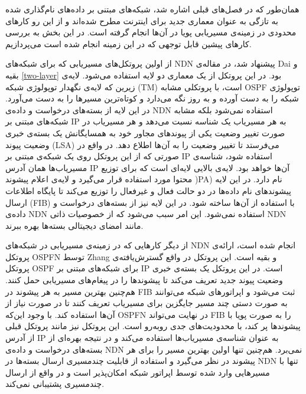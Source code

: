
\label{prevWorks}

همان‌طور که در فصل‌های قبلی اشاره شد، شبکه‌های مبتنی بر داده‌‌های نام‌گذاری شده به تازگی به عنوان معماری جدید برای اینترنت مطرح شده‌اند و از این رو کارهای محدودی در زمینه‌ی مسیریابی پویا در آن‌ها انجام گرفته است. در این بخش به بررسی کارهای پیشین قابل توجهی که در این زمینه انجام شده است می‌پردازیم.

از اولین پروتکل‌های مسیریابی که برای شبکه‌های NDN پیشنهاد شد، در مقاله‌ی Dai و بقیه \ref{two-layer} بود. در این پروتکل از یک معماری دو لایه استفاده می‌شود. لایه‌ی زیرین که لایه‌ی نگهدار توپولوژی شبکه  (TM) است، با پروتکلی مشابه OSPF توپولوژی شبکه را به دست آورده و به روز نگه می‌دارد و کوتاه‌ترین مسیرها را به دست می‌آورد. در این لایه از بسته‌های درخواست و داده‌ی NDN استفاده نمی‌شود بلکه مشابه شبکه‌های مبتنی بر IP به هر مسیریاب یک شناسه نسبت می‌دهد و هر مسیریاب در صورت تغییر وضعیت یکی از پیوند‌‌های مجاور خود به همسایگانش یک بسته‌ی خبری وضعیت پیوند  (LSA) می‌فرستد تا تغییر وضعیت را به آن‌ها اطلاع دهد. در واقع در صورتی که از این پروتکل روی یک شبکه‌ی مبتنی بر IP استفاده شود، شناسه‌ی مسیریاب‌ها همان آدرس IP آن‌ها خواهد بود. لایه‌ی بالایی لایه‌ای است که برای توزیع محتوا مورد استفاده قرار می‌گیرد و لایه‌ی اعلام پیشوند   )PA) نام دارد. در این لایه پیشوند‌های نام داده‌ها در دو حالت فعال و غیرفعال را توزیع می‌کند تا پایگاه اطلاعات ارسال (FIB) با استفاده از آن‌ها ساخته شود. در این لایه نیز از بسته‌های درخواست و داده‌ی NDN استفاده نمی‌شود. این امر سبب می‌شود که از خصوصیات ذاتی NDN مانند امضای دیجیتالی بسته‌ها بهره ببرند.

از دیگر کارهایی که در زمینه‌ی مسیریابی در شبکه‌های NDN انجام شده است، ارائه‌ی پروتکل OSPFN توسط Zhang و بقیه \cite{ospfn} است. این پروتکل در واقع گسترش‌یافته‌ی پروتکل OSPF برای شبکه‌های مبتنی بر IP است. در این پروتکل یک بسته‌ی خبری وضعیت پیوند جدید تعریف می‌کند تا پیشوند‌ها را در پیغام‌های مسیریابی حمل کنند. هم‌چنین بهترین مسیر به هر پیشوند در FIB ثبت می‌شود و اپراتورهای شبکه می‌توانند به صورت دستی چند مسیر جایگزین برای مسیریاب تعریف کنند تا در صورت نیاز از آن‌ها استفاده کند. با وجود این‌که OSPFN در نهایت می‌تواند FIB را به صورت پویا با پیشوندها پر کند، با محدودیت‌های جدی روبه‌رو است. این پروتکل نیز مانند پروتکل قبلی از آدرس IP به عنوان شناسه‌ی مسیریاب‌ها استفاده می‌کند و در نتیجه بهره‌ای از بسته‌های درخواست و داده‌ی NDN نمی‌برد. هم‌چنین تنها اولین بهترین مسیر را برای هر پیشوند در نظر می‌گیرد و استفاده از قابلیت چندمسیری ارسال بسته‌ها در NDN تنها با مسیرهایی وارد شده توسط اپراتور شبکه امکان‌پذیر است و در واقع از ارسال چندمسیری پشتیبانی نمی‌کند.

